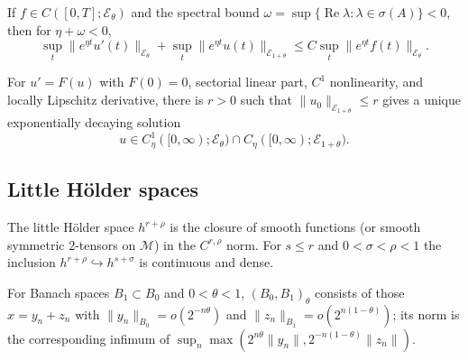 \begin{proposition}
\label{prop:chow-iv-linear-maximal-regularity}

If $f\in C([0,T];\mathcal E_\theta)$ and the spectral bound
$\omega=\sup\{\operatorname{Re}\lambda:\lambda\in\sigma(A)\}<0$, then for
$\eta+\omega<0$,
\begin{equation*}
 \sup_t\|e^{\eta t}u'(t)\|_{\mathcal E_\theta}
 +\sup_t\|e^{\eta t}u(t)\|_{\mathcal E_{1+\theta}}
 \le C\sup_t\|e^{\eta t}f(t)\|_{\mathcal E_\theta}.
 \tag{35.12}
\end{equation*}
\end{proposition}

\begin{proposition}
\label{prop:chow-iv-nonlinear-maximal-regularity}


For $u'=F(u)$ with $F(0)=0$, sectorial linear part, $C^1$ nonlinearity,
and locally Lipschitz derivative, there is $r>0$ such that
$\|u_0\|_{\mathcal E_{1+\theta}}\le r$ gives a unique exponentially decaying
solution
\[
 u\in C^1_\eta([0,\infty);\mathcal E_\theta)\cap
 C_\eta([0,\infty);\mathcal E_{1+\theta}).
\]
\end{proposition}

\subsection{Little H\"older spaces}

\begin{definition}
\label{def:chow-iv-little-holder-spaces}

The little H\"older space $h^{r+\rho}$ is the closure of smooth functions (or
smooth symmetric $2$-tensors on $\mathcal M$) in the $C^{r,\rho}$ norm.  For
$s\le r$ and $0<\sigma<\rho<1$ the inclusion
$h^{r+\rho}\hookrightarrow h^{s+\sigma}$ is continuous and dense.
\end{definition}

\begin{definition}
\label{def:chow-iv-continuous-interpolation}

For Banach spaces $B_1\subset B_0$ and $0<\theta<1$, $(B_0,B_1)_\theta$
consists of those $x=y_n+z_n$ with
$\|y_n\|_{B_0}=o(2^{-n\theta})$ and
$\|z_n\|_{B_1}=o(2^{n(1-\theta)})$; its norm is the corresponding infimum of
$\sup_n\max(2^{n\theta}\|y_n\|,2^{-n(1-\theta)}\|z_n\|)$.
\end{definition}


